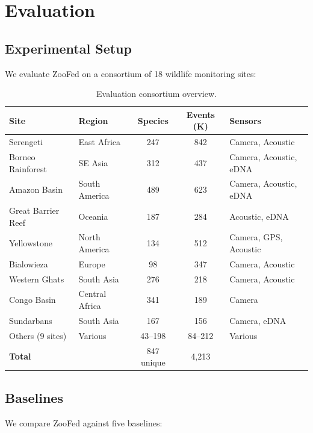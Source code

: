 \section{Evaluation}

\label{sec:evaluation}

\subsection{Experimental Setup}

We evaluate ZooFed on a consortium of 18 wildlife monitoring sites:

\begin{table}[H]
\centering
\caption{Evaluation consortium overview.}
\label{tab:consortium}
\begin{tabularx}{\textwidth}{@{}llccl@{}}
\toprule
\textbf{Site} & \textbf{Region} & \textbf{Species} & \textbf{Events (K)} & \textbf{Sensors} \\
\midrule
Serengeti & East Africa & 247 & 842 & Camera, Acoustic \\
Borneo Rainforest & SE Asia & 312 & 437 & Camera, Acoustic, eDNA \\
Amazon Basin & South America & 489 & 623 & Camera, Acoustic, eDNA \\
Great Barrier Reef & Oceania & 187 & 284 & Acoustic, eDNA \\
Yellowstone & North America & 134 & 512 & Camera, GPS, Acoustic \\
Bialowieza & Europe & 98 & 347 & Camera, Acoustic \\
Western Ghats & South Asia & 276 & 218 & Camera, Acoustic \\
Congo Basin & Central Africa & 341 & 189 & Camera \\
Sundarbans & South Asia & 167 & 156 & Camera, eDNA \\
Others (9 sites) & Various & 43--198 & 84--212 & Various \\
\midrule
\textbf{Total} & & 847 unique & 4,213 & \\
\bottomrule
\end{tabularx}
\end{table}

\subsection{Baselines}

We compare ZooFed against five baselines:

